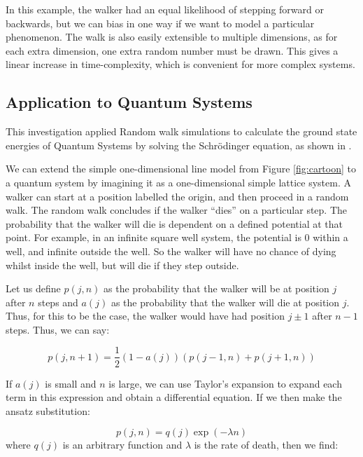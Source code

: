 \documentclass[journal]{IEEEtran}
\begin{document}
In this example, the walker had an equal likelihood of stepping forward or
backwards, but we can bias in one way if we want to model a particular
phenomenon. The walk is also easily extensible to multiple dimensions, as for
each extra dimension, one extra random number must be drawn. This gives a linear
increase in time-complexity, which is convenient for more complex systems.

\subsection{Application to Quantum Systems}

This investigation applied Random walk simulations to calculate the ground state
energies of Quantum Systems by solving the Schr\"{o}dinger equation, as shown in
\cite{Ceperley1983}.

We can extend the simple one-dimensional line model from Figure
\ref{fig:cartoon} to a quantum system by imagining it as a one-dimensional
simple lattice system. A walker can start at a position labelled the origin, and
then proceed in a random walk. The random walk concludes if the walker ``dies''
on a particular step. The probability that the walker will die is dependent on a
defined potential at that point. For example, in an infinite square well system,
the potential is 0 within a well, and infinite outside the well. So the walker
will have no chance of dying whilst inside the well, but will die if they step
outside.

Let us define $p(j,n)$ as the probability that the walker will be at position
$j$ after $n$ steps and $a(j)$ as the probability that the walker will die at
position $j$. Thus, for this to be the case, the walker would have had position
$j\pm1$ after $n-1$ steps. Thus, we can say:

\begin{equation}
  p(j, n+1) =  \frac{1}{2}(1-a(j))(p(j-1,n) + p(j+1,n))
  \nonumber
\end{equation}

If $a(j)$ is small and $n$ is large, we can use Taylor's expansion to expand
each term in this expression and obtain a differential equation. If we then
make the ansatz substitution:

\begin{equation}
  p(j,n) = q(j) \exp(-\lambda n)
  \label{eq:firsteq}
\end{equation}
where $q(j)$ is an arbitrary function and $\lambda$ is the rate of death, then
we find:
\end{document}
